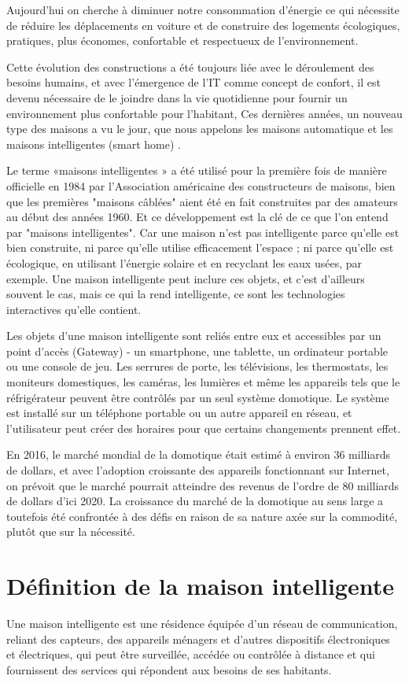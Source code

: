 Aujourd’hui on cherche à  diminuer notre consommation d'énergie ce qui nécessite de réduire les déplacements en voiture et de construire des logements écologiques, pratiques, plus économes, confortable et respectueux de l'environnement.


Cette évolution des constructions a été toujours liée avec le déroulement des besoins humains, et avec l'émergence de l’IT comme concept de confort, il est devenu nécessaire de le joindre dans la vie quotidienne pour fournir un environnement plus confortable pour l'habitant, Ces dernières années, un nouveau type des maisons a vu le jour, que nous appelons les maisons automatique et les maisons intelligentes (smart home) .


Le terme «maisons intelligentes » a été utilisé pour la première fois de manière officielle en 1984 par l'Association américaine des constructeurs de maisons, bien que les premières "maisons câblées" aient été en fait construites par des amateurs au début des années 1960. Et ce développement est la clé de ce que l'on entend par "maisons intelligentes". Car une maison n'est pas intelligente parce qu'elle est bien construite, ni parce qu'elle utilise efficacement l'espace ; ni parce qu'elle est écologique, en utilisant l'énergie solaire et en recyclant les eaux usées, par exemple. Une maison intelligente peut inclure ces objets, et c'est d'ailleurs souvent le cas, mais ce qui la rend intelligente, ce sont les technologies interactives qu'elle contient.


Les objets d'une maison intelligente sont reliés entre eux et accessibles par un point d’accès (Gateway) - un smartphone, une tablette, un ordinateur portable ou une console de jeu. Les serrures de porte, les télévisions, les thermostats, les moniteurs domestiques, les caméras, les lumières et même les appareils tels que le réfrigérateur peuvent être contrôlés par un seul système domotique. Le système est installé sur un téléphone portable ou un autre appareil en réseau, et l'utilisateur peut créer des horaires pour que certains changements prennent effet.


En 2016, le marché mondial de la domotique était estimé à environ 36 milliards de dollars, et avec l'adoption croissante des appareils fonctionnant sur Internet, on prévoit que le marché pourrait atteindre des revenus de l'ordre de 80 milliards de dollars d'ici 2020. La croissance du marché de la domotique au sens large a toutefois été confrontée à des défis en raison de sa nature axée sur la commodité, plutôt que sur la nécessité.
\section{Définition de la maison intelligente}
Une maison intelligente est une résidence équipée d'un réseau de communication, reliant des capteurs, des appareils ménagers et d'autres dispositifs électroniques et électriques, qui peut être surveillée, accédée ou contrôlée à distance et qui fournissent des services qui répondent aux besoins de ses habitants\cite{chap31}.


